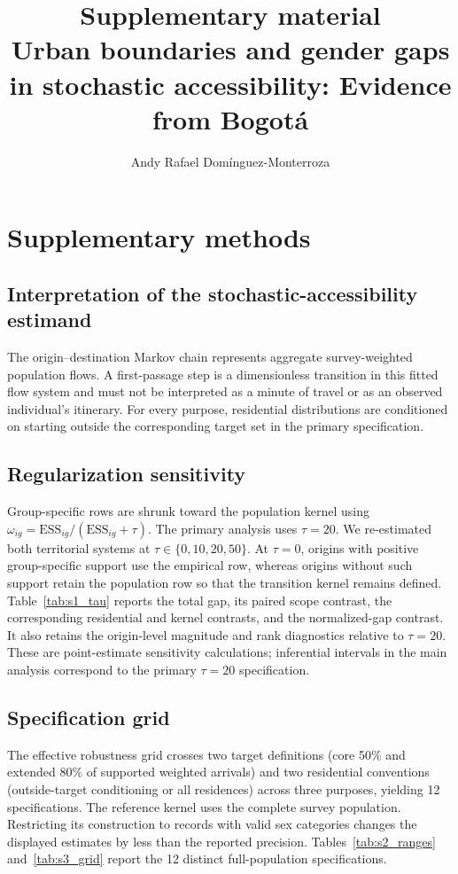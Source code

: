 \documentclass[11pt]{article}
\title{Supplementary material\\
Urban boundaries and gender gaps in stochastic accessibility: Evidence from Bogot\'a}
\author{Andy Rafael Domínguez-Monterroza}
\date{}
\begin{document}
\renewcommand{\thetable}{S\arabic{table}}
\maketitle

\section{Supplementary methods}

\subsection{Interpretation of the stochastic-accessibility estimand}
The origin--destination Markov chain represents aggregate survey-weighted population
flows. A first-passage step is a dimensionless transition in this fitted flow system and
must not be interpreted as a minute of travel or as an observed individual's itinerary.
For every purpose, residential distributions are conditioned on starting outside the
corresponding target set in the primary specification.

\subsection{Regularization sensitivity}
Group-specific rows are shrunk toward the population kernel using
$\omega_{ig}=\mathrm{ESS}_{ig}/(\mathrm{ESS}_{ig}+\tau)$. The primary analysis uses
$\tau=20$. We re-estimated both territorial systems at $\tau\in\{0,10,20,50\}$.
At $\tau=0$, origins with positive group-specific support use the empirical row, whereas
origins without such support retain the population row so that the transition kernel
remains defined. Table~\ref{tab:s1_tau} reports the total gap, its paired scope contrast,
the corresponding residential and kernel contrasts, and the normalized-gap contrast.
It also retains the origin-level magnitude and rank diagnostics relative to $\tau=20$.
These are point-estimate sensitivity calculations; inferential intervals in the main
analysis correspond to the primary $\tau=20$ specification.



\subsection{Specification grid}
The effective robustness grid crosses two target definitions (core 50\% and extended
80\% of supported weighted arrivals) and two residential conventions (outside-target
conditioning or all residences) across three purposes, yielding 12 specifications.
The reference kernel uses the complete survey population. Restricting its construction
to records with valid sex categories changes the displayed estimates by less than the
reported precision. Tables~\ref{tab:s2_ranges} and~\ref{tab:s3_grid} report the 12
distinct full-population specifications.
\end{document}
